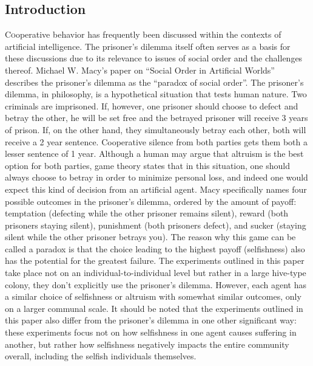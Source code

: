 \documentclass[twoside]{article}
\begin{document}
\begin{multicols}{2} %

\section{Introduction}

	\lettrine[nindent=0em,lines=2]{C} ooperative behavior has frequently been discussed within the contexts of artificial intelligence. The prisoner's dilemma itself often serves as a basis for these discussions due to its relevance to issues of social order and the challenges thereof. Michael W. Macy's paper on ``Social Order in Artificial Worlds'' describes the prisoner's dilemma as the ``paradox of social order''. \cite{macy} The prisoner's dilemma, in philosophy, is a hypothetical situation that tests human nature. Two criminals are imprisoned. If, however, one prisoner should choose to defect and betray the other, he will be set free and the betrayed prisoner will receive 3 years of prison. If, on the other hand, they simultaneously betray each other, both will receive a 2 year sentence. Cooperative silence from both parties gets them both a lesser sentence of 1 year. Although a human may argue that altruism is the best option for both parties, game theory states that in this situation, one should always choose to betray in order to minimize personal loss, and indeed one would expect this kind of decision from an artificial agent. Macy specifically names four possible outcomes in the prisoner's dilemma, ordered by the amount of payoff: temptation (defecting while the other prisoner remains silent), reward (both prisoners staying silent), punishment (both prisoners defect), and sucker (staying silent while the other prisoner betrays you). The reason why this game can be called a paradox is that the choice leading to the highest payoff (selfishness) also has the potential for the greatest failure. The experiments outlined in this paper take place not on an individual-to-individual level but rather in a large hive-type colony, they don't explicitly use the prisoner's dilemma. However, each agent has a similar choice of selfishness or altruism with somewhat similar outcomes, only on a larger communal scale. It should be noted that the experiments outlined in this paper also differ from the prisoner's dilemma in one other significant way: these experiments focus not on how selfishness in one agent causes suffering in another, but rather how selfishness negatively impacts the entire community overall, including the selfish individuals themselves.



\end{multicols}
\end{document}

